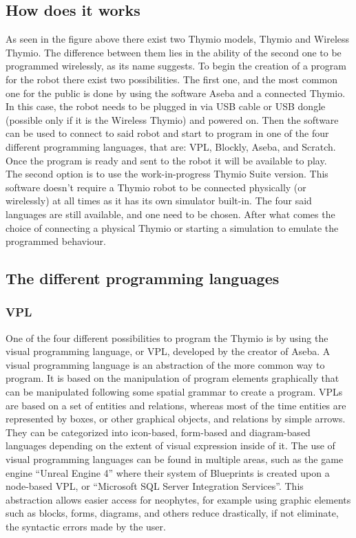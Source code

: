 \documentclass{scrartcl}
\begin{document}
\subsection{How does it works}

As seen in the figure above there exist two Thymio models, Thymio and Wireless Thymio. 
The difference between them lies in the ability of the second one to be programmed wirelessly, 
as its name suggests. To begin the creation of a program for the robot there exist two possibilities.
The first one, and the most common one for the public is done by using the software Aseba and a connected Thymio. 
In this case, the robot needs to be plugged in via USB cable or USB dongle (possible only if it is the Wireless Thymio) and powered on. 
Then the software can be used to connect to said robot and start to program in one of the four different programming languages, 
that are: VPL, Blockly, Aseba, and Scratch. Once the program is ready and sent to the robot it will be available to play. \\

The second option is to use the work-in-progress Thymio Suite version. 
This software doesn’t require a Thymio robot to be connected physically (or wirelessly) at all times as it has its own simulator built-in. 
The four said languages are still available, and one need to be chosen. 
After what comes the choice of connecting a physical Thymio or starting a simulation to emulate the programmed behaviour.

\subsection{The different programming languages}
\subsubsection{VPL}

One of the four different possibilities to program the Thymio is by using the visual programming language, or VPL, 
developed by the creator of Aseba. A visual programming language is an abstraction of the more common way to program. 
It is based on the manipulation of program elements graphically that can be manipulated following some spatial grammar to create a program. 
VPLs are based on a set of entities and relations, whereas most of the time entities are represented by boxes, 
or other graphical objects, and relations by simple arrows. They can be categorized into icon-based, 
form-based and diagram-based languages depending on the extent of visual expression inside of it. 
The use of visual programming languages can be found in multiple areas, such as the game engine “Unreal Engine 4” where their system of Blueprints is created upon a node-based VPL, 
or “Microsoft SQL Server Integration Services”. This abstraction allows easier access for neophytes, 
for example using graphic elements such as blocks, forms, diagrams, and others reduce drastically, if not eliminate, the syntactic errors made by the user.\\
\end{document}
